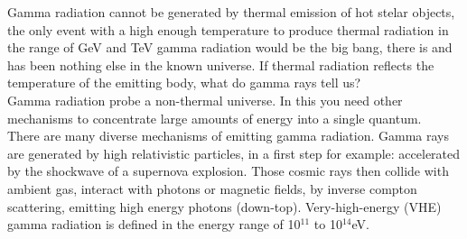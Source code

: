 \documentclass[12pt,article,type=msc,colorback,accentcolor=tud9c]{tudthesis}
\begin{document}
\begin{wrapfigure}{R}{0.5\textwidth}
\texttt{[image: D:/OwnCloudData/00\_WriteUP/04\_Thesis/Pic/Proposal/Fig/\{Fermi\_image01]}.jpg}
\caption{\label{fig:LAT}FermiLAT Picuture from \cite{FermiLAT}}
\end{wrapfigure}
Gamma radiation cannot be generated by thermal emission of hot stelar objects, the only event with a high enough temperature to produce thermal radiation in the range of GeV and TeV gamma radiation would be the big bang, there is and has been nothing else in the known universe. If thermal radiation reflects the temperature of the emitting body, what do gamma rays tell us?\\
Gamma radiation probe a non-thermal universe. In this you need other mechanisms to concentrate large amounts of energy into a single quantum.\\
There are many diverse mechanisms of emitting gamma radiation. Gamma rays are generated by high relativistic particles, in a first step for example: accelerated by the shockwave of a supernova explosion. Those cosmic rays then collide with ambient gas, interact with photons or magnetic fields, by inverse compton scattering, emitting high energy photons (down-top). Very-high-energy (VHE) gamma radiation is defined in the energy range of 10$^{11}$ to 10$^{14} $eV.
\end{document}
